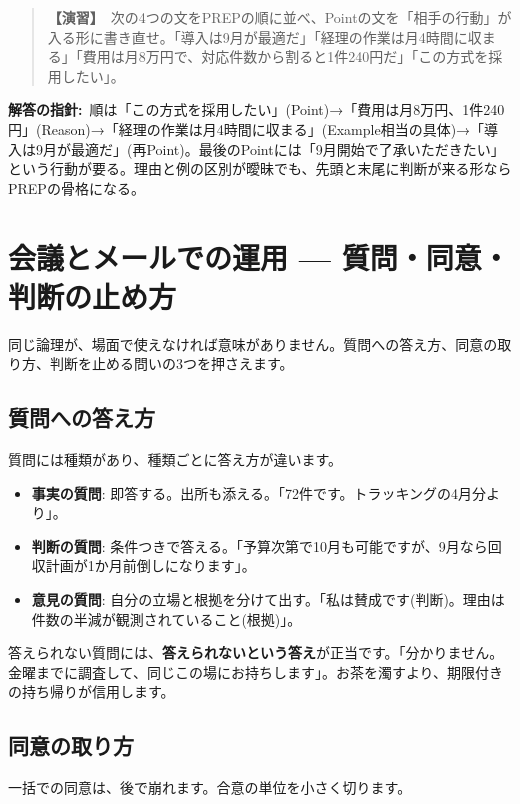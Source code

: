 \documentclass{article}
\begin{document}
\begin{quote}
\textbf{【演習】}\ 次の4つの文をPREPの順に並べ、Pointの文を「相手の行動」が入る形に書き直せ。「導入は9月が最適だ」「経理の作業は月4時間に収まる」「費用は月8万円で、対応件数から割ると1件240円だ」「この方式を採用したい」。
\end{quote}

\textbf{解答の指針:}\ 順は「この方式を採用したい」(Point)→「費用は月8万円、1件240円」(Reason)→「経理の作業は月4時間に収まる」(Example相当の具体)→「導入は9月が最適だ」(再Point)。最後のPointには「9月開始で了承いただきたい」という行動が要る。理由と例の区別が曖昧でも、先頭と末尾に判断が来る形ならPREPの骨格になる。

\section{会議とメールでの運用 — 質問・同意・判断の止め方}

同じ論理が、場面で使えなければ意味がありません。質問への答え方、同意の取り方、判断を止める問いの3つを押さえます。

\subsection{質問への答え方}

質問には種類があり、種類ごとに答え方が違います。

\begin{itemize}
\item \textbf{事実の質問}: 即答する。出所も添える。「72件です。トラッキングの4月分より」。
\item \textbf{判断の質問}: 条件つきで答える。「予算次第で10月も可能ですが、9月なら回収計画が1か月前倒しになります」。
\item \textbf{意見の質問}: 自分の立場と根拠を分けて出す。「私は賛成です(判断)。理由は件数の半減が観測されていること(根拠)」。
\end{itemize}

答えられない質問には、\textbf{答えられないという答え}が正当です。「分かりません。金曜までに調査して、同じこの場にお持ちします」。お茶を濁すより、期限付きの持ち帰りが信用します。

\subsection{同意の取り方}

一括での同意は、後で崩れます。合意の単位を小さく切ります。
\end{document}
